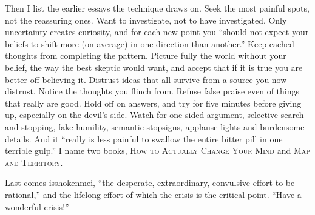 Then I list the earlier essays the technique draws on. Seek the most painful spots, not the reassuring ones. Want to investigate, not to have investigated. Only uncertainty creates curiosity, and for each new point you ``should not expect your beliefs to shift more (on average) in one direction than another.'' Keep cached thoughts from completing the pattern. Picture fully the world without your belief, the way the best skeptic would want, and accept that if it is true you are better off believing it. Distrust ideas that all survive from a source you now distrust. Notice the thoughts you flinch from. Refuse false praise even of things that really are good. Hold off on answers, and try for five minutes before giving up, especially on the devil's side. Watch for one-sided argument, selective search and stopping, fake humility, semantic stopsigns, applause lights and burdensome details.  And it ``really is less painful to swallow the entire bitter pill in one terrible gulp.'' I name two books, \textsc{How to Actually Change Your Mind} and \textsc{Map and Territory}. 

Last comes isshokenmei, ``the desperate, extraordinary, convulsive effort to be rational,'' and the lifelong effort of which the crisis is the critical point.  ``Have a wonderful crisis!''
